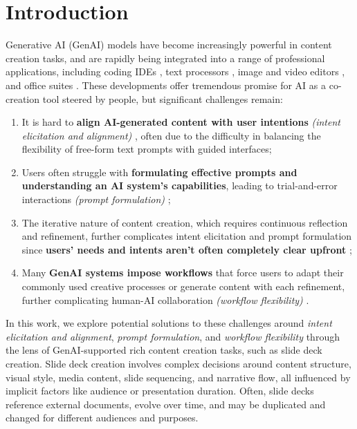 
\section{Introduction}


Generative AI (GenAI) models have become increasingly powerful in content creation tasks, and are rapidly being integrated into a range of professional applications, including coding IDEs \cite{github_github_2024, chen_evaluating_2021}, text processors \cite{grammarly_grammarly_2024, brown_language_2020}, image and video editors \cite{adobe_adobe_2024, saharia_photorealistic_2022, ho_imagen_2022}, and office suites \cite{microsoft_powerpoint_2024b}. These developments offer tremendous promise for AI as a co-creation tool steered by people, but significant challenges remain:


\begin{enumerate}
    \item It is hard to \textbf{align AI-generated content with user intentions} \textit{(intent elicitation and alignment)} \cite{chen_evaluating_2021, terry_ai_2023}, often due to the difficulty in balancing the flexibility of free-form text prompts with guided interfaces;
    \item Users often struggle with \textbf{formulating effective prompts and understanding an AI system’s capabilities}, leading to trial-and-error interactions \textit{(prompt formulation)} \cite{zamfirescu-pereira_why_2023, subramonyam_bridging_2024, mahdavi_goloujeh_is_2024};
    \item The iterative nature of content creation, which requires continuous reflection and refinement, further complicates intent elicitation and prompt formulation since \textbf{users’ needs and intents aren’t often completely clear upfront} \cite{BuxtonSketchingUserExperiences2007, DesignReflectiveConversation1992, TerryCreativeNeedsUIDesign2002, shneiderman_creativity_2007}; 
    \item Many \textbf{GenAI systems impose workflows} that force users to adapt their commonly used creative processes or generate content with each refinement, further complicating human-AI collaboration \textit{(workflow flexibility)} \cite{sarkar_exploring_2023, tankelevitch_metacognitive_2023}.
\end{enumerate}

In this work, we explore potential solutions to these challenges around \textit{intent elicitation and alignment}, \textit{prompt formulation}, and \textit{workflow flexibility} through the lens of GenAI-supported rich content creation tasks, such as slide deck creation.
Slide deck creation involves complex decisions around content structure, visual style, media content, slide sequencing, and narrative flow, all influenced by implicit factors like audience or presentation duration.
Often, slide decks reference external documents, evolve over time,  and may be duplicated and changed for different audiences and purposes.

